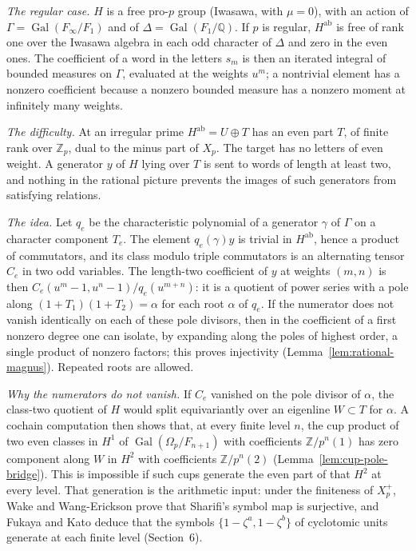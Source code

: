\documentclass[11pt]{article}
\theoremstyle{definition}
\numberwithin{equation}{section}
\begin{document}
\emph{The regular case.} $H$ is a free pro-$p$ group (Iwasawa, with $\mu=0$), with an action of
$\Gamma=\operatorname{Gal}(F_\infty/F_1)$ and of $\Delta=\operatorname{Gal}(F_1/\mathbb Q)$. If $p$ is regular,
$H^{\mathrm{ab}}$ is free of rank one over the Iwasawa algebra in each odd character of $\Delta$ and zero in the
even ones. The coefficient of a word in the letters $s_m$ is then an iterated integral of bounded measures on
$\Gamma$, evaluated at the weights $u^m$; a nontrivial element has a nonzero coefficient because a nonzero bounded
measure has a nonzero moment at infinitely many weights.

\emph{The difficulty.} At an irregular prime $H^{\mathrm{ab}}=U\oplus T$ has an even part $T$, of finite rank over
$\mathbb Z_p$, dual to the minus part of $X_p$. The target has no letters of even weight. A generator $y$ of $H$
lying over $T$ is sent to words of length at least two, and nothing in the rational picture prevents the images
of such generators from satisfying relations.

\emph{The idea.} Let $q_e$ be the characteristic polynomial of a generator $\gamma$ of $\Gamma$ on a character
component $T_e$. The element $q_e(\gamma)y$ is trivial in $H^{\mathrm{ab}}$, hence a product of commutators, and its
class modulo triple commutators is an alternating tensor $C_e$ in two odd variables. The length-two coefficient
of $y$ at weights $(m,n)$ is then $C_e(u^m-1,u^n-1)/q_e(u^{m+n})$: it is a quotient of power series with a pole
along $(1+T_1)(1+T_2)=\alpha$ for each root $\alpha$ of $q_e$. If the numerator does not vanish identically on
each of these pole divisors, then in the coefficient of a first nonzero degree one can isolate, by expanding along
the poles of highest order, a single product of nonzero factors; this proves injectivity
(Lemma~\ref{lem:rational-magnus}). Repeated roots are allowed.

\emph{Why the numerators do not vanish.} If $C_e$ vanished on the pole divisor of $\alpha$, the class-two quotient
of $H$ would split equivariantly over an eigenline $W\subset T$ for $\alpha$. A cochain computation then shows
that, at every finite level $n$, the cup product of two even classes in $H^1$ of
$\operatorname{Gal}(\Omega_p/F_{n+1})$ with coefficients $\mathbb Z/p^n(1)$ has zero component along $W$ in
$H^2$ with coefficients $\mathbb Z/p^n(2)$ (Lemma~\ref{lem:cup-pole-bridge}). This is impossible if such cups
generate the even part of that $H^2$ at every level. That generation is the arithmetic input: under the
finiteness of $X_p^+$, Wake and Wang-Erickson prove that Sharifi's symbol map is surjective, and Fukaya and Kato
deduce that the symbols $\{1-\zeta^a,1-\zeta^b\}$ of cyclotomic units generate at each finite level
(Section~6).
\end{document}
